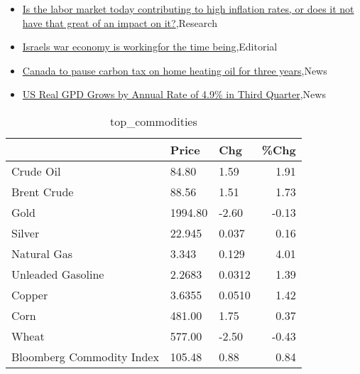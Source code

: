 \documentclass{article}%
\begin{document}
\begin{itemize}
\item%
\href{https://reddit.com/r/Economics/comments/17heu1x/is\_the\_labor\_market\_today\_contributing\_to\_high/}{Is the labor market today contributing to high inflation rates, or does it not have that great of an impact on it?},Research%
\item%
\href{https://reddit.com/r/Economics/comments/17hd2ig/israels\_war\_economy\_is\_workingfor\_the\_time\_being/}{Israels war economy is workingfor the time being},Editorial%
\item%
\href{https://reddit.com/r/Economics/comments/17hcbdw/canada\_to\_pause\_carbon\_tax\_on\_home\_heating\_oil/}{Canada to pause carbon tax on home heating oil for three years},News%
\item%
\href{https://reddit.com/r/Economics/comments/17h8r8o/us\_real\_gpd\_grows\_by\_annual\_rate\_of\_49\_in\_third/}{US Real GPD Grows by Annual Rate of 4.9\% in Third Quarter},News%
\end{itemize}%


\begin{table}[htbp]%
\caption{top\_commodities}%
\centering%
\begin{adjustbox}{width=1\textwidth}%
\begin{tabular}{lllr}
\toprule
                          &   Price &    Chg &  \%Chg \\
\midrule
               Crude Oil  &   84.80 &   1.59 &  1.91 \\
             Brent Crude  &   88.56 &   1.51 &  1.73 \\
                    Gold  & 1994.80 &  -2.60 & -0.13 \\
                  Silver  &  22.945 &  0.037 &  0.16 \\
             Natural Gas  &   3.343 &  0.129 &  4.01 \\
       Unleaded Gasoline  &  2.2683 & 0.0312 &  1.39 \\
                  Copper  &  3.6355 & 0.0510 &  1.42 \\
                    Corn  &  481.00 &   1.75 &  0.37 \\
                   Wheat  &  577.00 &  -2.50 & -0.43 \\
Bloomberg Commodity Index &  105.48 &   0.88 &  0.84 \\
\bottomrule
\end{tabular}
%
\end{adjustbox}%
\end{table}

%
\end{document}
